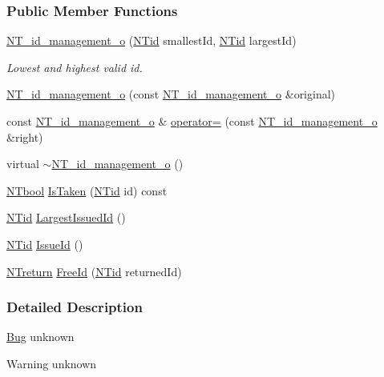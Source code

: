 \subsubsection*{Public Member Functions}
\begin{DoxyCompactItemize}
\item 
\hyperlink{class_n_t__id__management__o_a66ab4d52ed033a9a8d81ae4804adaab9}{NT\_\-id\_\-management\_\-o} (\hyperlink{nt__types_8h_ab5cab5f78fdd2211c340cbe527a4afd7}{NTid} smallestId, \hyperlink{nt__types_8h_ab5cab5f78fdd2211c340cbe527a4afd7}{NTid} largestId)
\begin{DoxyCompactList}\small\item\em Lowest and highest valid id. \item\end{DoxyCompactList}\item 
\hyperlink{class_n_t__id__management__o_ab8d3e2f45542f703f9e39bceb8694a4b}{NT\_\-id\_\-management\_\-o} (const \hyperlink{class_n_t__id__management__o}{NT\_\-id\_\-management\_\-o} \&original)
\item 
const \hyperlink{class_n_t__id__management__o}{NT\_\-id\_\-management\_\-o} \& \hyperlink{class_n_t__id__management__o_a35c4b94c97e6ca61c05ce9c719839b2e}{operator=} (const \hyperlink{class_n_t__id__management__o}{NT\_\-id\_\-management\_\-o} \&right)
\item 
virtual \hyperlink{class_n_t__id__management__o_a279a4c58a7d33dd31e8d5bd5b1c714cb}{$\sim$NT\_\-id\_\-management\_\-o} ()
\item 
\hyperlink{nt__types_8h_a9f3200824a52174bb5be77bed3838822}{NTbool} \hyperlink{class_n_t__id__management__o_a12bbd391c2d2de7c7a6770855c887287}{IsTaken} (\hyperlink{nt__types_8h_ab5cab5f78fdd2211c340cbe527a4afd7}{NTid} id) const 
\item 
\hyperlink{nt__types_8h_ab5cab5f78fdd2211c340cbe527a4afd7}{NTid} \hyperlink{class_n_t__id__management__o_a9a917c875ab31f1091751f2ea6ba1953}{LargestIssuedId} ()
\item 
\hyperlink{nt__types_8h_ab5cab5f78fdd2211c340cbe527a4afd7}{NTid} \hyperlink{class_n_t__id__management__o_a6b526d10bc66a3661f3911fb29ca0051}{IssueId} ()
\item 
\hyperlink{nt__types_8h_ab9564ee8f091e809d21b8451c6683c53}{NTreturn} \hyperlink{class_n_t__id__management__o_a4818f678abebc259d969d884120f7e91}{FreeId} (\hyperlink{nt__types_8h_ab5cab5f78fdd2211c340cbe527a4afd7}{NTid} returnedId)
\end{DoxyCompactItemize}


\subsubsection{Detailed Description}
\begin{Desc}
\item[\hyperlink{bug__bug000100}{Bug}]unknown \end{Desc}
\begin{DoxyWarning}{Warning}
unknown 
\end{DoxyWarning}


